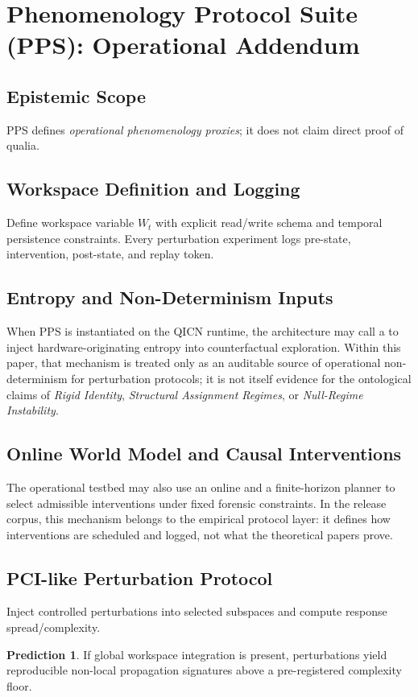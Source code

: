 \documentclass[11pt,a4paper]{article}
\theoremstyle{definition}
\newtheorem{prediction}[theorem]{Prediction}
\begin{document}
\section{Phenomenology Protocol Suite (PPS): Operational Addendum}
\subsection{Epistemic Scope}
PPS defines \emph{operational phenomenology proxies}; it does not claim direct proof of qualia.

\subsection{Workspace Definition and Logging}
Define workspace variable $W_t$ with explicit read/write schema and temporal persistence constraints. Every perturbation experiment logs pre-state, intervention, post-state, and replay token.

\subsection{Entropy and Non-Determinism Inputs}
When PPS is instantiated on the QICN runtime, the architecture may call a \texttt{\allowbreak{}\allowbreak{}} to inject hardware-originating entropy into counterfactual exploration. Within this paper, that mechanism is treated only as an auditable source of operational non-determinism for perturbation protocols; it is not itself evidence for the ontological claims of \textit{Rigid Identity}, \textit{Structural Assignment Regimes}, or \textit{Null-Regime Instability}.

\subsection{Online World Model and Causal Interventions}
The operational testbed may also use an online \texttt{\allowbreak{}\allowbreak{}} and a finite-horizon planner to select admissible interventions under fixed forensic constraints. In the release corpus, this mechanism belongs to the empirical protocol layer: it defines how interventions are scheduled and logged, not what the theoretical papers prove.

\subsection{PCI-like Perturbation Protocol}
Inject controlled perturbations into selected subspaces and compute response spread/complexity.
\begin{prediction}
If global workspace integration is present, perturbations yield reproducible non-local propagation signatures above a pre-registered complexity floor.
\end{prediction}
\end{document}
